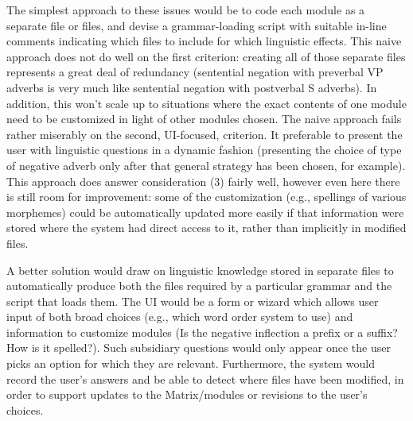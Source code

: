 \documentclass[11pt]{article}
\begin{document}
The simplest approach to these issues would be to code each module as a
separate file or files, and devise a grammar-loading script with
suitable in-line comments indicating which files to include for which
linguistic effects.  This naive approach does not do well on the first
criterion: creating all of those separate files represents a great
deal of redundancy (sentential negation with preverbal VP adverbs is
very much like sentential negation with postverbal S adverbs).
In addition, this won't scale up to
situations where the exact contents of one module need to be
customized in light of other modules chosen.  The naive approach fails
rather miserably on the second, UI-focused, criterion.  It 
preferable to present the user with linguistic questions in a dynamic
fashion (presenting the choice of type of negative adverb only after
that general strategy has been chosen, for example).  This approach
does answer consideration (3) fairly well, however
even here there is still room for improvement:
some of the customization (e.g., spellings of various morphemes) could
be automatically updated more easily if that information were stored
where the system had direct access to it, rather than implicitly in
modified files.

A better solution would draw on linguistic knowledge stored in
separate files to automatically produce both the files required by a
particular grammar and the script that loads them.  The UI 
would be a form or wizard which allows user input of both
broad choices (e.g., which word order system to use) and information
to customize modules (Is the negative inflection a prefix or a suffix?
How is it spelled?).  Such subsidiary questions would only appear once
the user picks an option for which they are relevant. 
Furthermore, the system would record the user's answers 
and be able to detect where files have been modified, in order to
support updates to the Matrix/modules or revisions to the user's choices.
\end{document}
